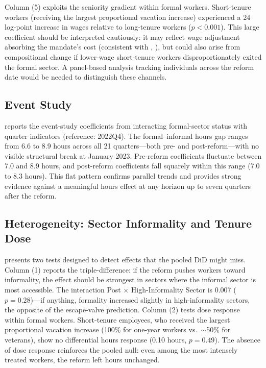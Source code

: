 \documentclass[12pt]{article}
\begin{document}
Column (5) exploits the seniority gradient within formal workers. Short-tenure workers (receiving the largest proportional vacation increase) experienced a 24 log-point increase in wages relative to long-tenure workers ($p < 0.001$). This large coefficient should be interpreted cautiously: it may reflect wage adjustment absorbing the mandate's cost (consistent with \citeauthor{summers1989}, \citeyear{summers1989}), but could also arise from compositional change if lower-wage short-tenure workers disproportionately exited the formal sector. A panel-based analysis tracking individuals across the reform date would be needed to distinguish these channels.



\subsection{Event Study}

 reports the event-study coefficients from interacting formal-sector status with quarter indicators (reference: 2022Q4). The formal--informal hours gap ranges from 6.6 to 8.9 hours across all 21 quarters---both pre- and post-reform---with no visible structural break at January 2023. Pre-reform coefficients fluctuate between 7.0 and 8.9 hours, and post-reform coefficients fall squarely within this range (7.0 to 8.3 hours). This flat pattern confirms parallel trends and provides strong evidence against a meaningful hours effect at any horizon up to seven quarters after the reform.



\subsection{Heterogeneity: Sector Informality and Tenure Dose}

 presents two tests designed to detect effects that the pooled DiD might miss. Column (1) reports the triple-difference: if the reform pushes workers toward informality, the effect should be strongest in sectors where the informal sector is most accessible. The interaction Post $\times$ High-Informality Sector is 0.007 ($p = 0.28$)---if anything, formality increased slightly in high-informality sectors, the opposite of the escape-valve prediction. Column (2) tests dose response within formal workers. Short-tenure employees, who received the largest proportional vacation increase (100\% for one-year workers vs.\ $\sim$50\% for veterans), show no differential hours response (0.10 hours, $p = 0.49$). The absence of dose response reinforces the pooled null: even among the most intensely treated workers, the reform left hours unchanged.
\end{document}
